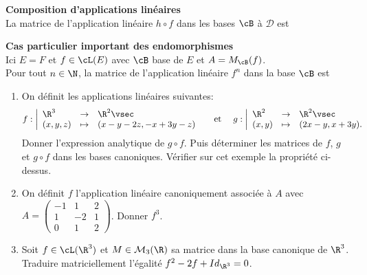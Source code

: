 \documentclass[a4paper, 11pt]{article}
\begin{document}
 


\begin{prop} \textbf{Composition d'applications lin\'eaires}\vsec\\
La matrice de l'application lin\'eaire $h\circ f$ dans les bases $\cB$ \`a $\mathcal{D}$ est \dotfill \vsec
\end{prop}




\begin{prop} \textbf{Cas particulier important des endomorphismes}\\
Ici $E=F$ et $f\in\cL(E)$ avec $\cB$ base de $E$ et $A=M_{\cB}(f)$.\vsec\\
\noindent Pour tout $n\in\N$, la matrice de l'application lin\'eaire $f^n$ dans la base $\cB$ est \dotfill \vsec
\end{prop}


{\footnotesize \begin{exercice}
\begin{enumerate}
\item On d\'efinit les applications lin\'eaires suivantes:
$$f: \left|\begin{array}{lllllllll}
\R^3 & \rightarrow & \R^2\vsec\\
(x,y,z) & \mapsto &(x-y-2z,-x+3y-z)
\end{array} \right. \quad \textmd{ et } \quad
g: \left|\begin{array}{lllllllll}
 \R^2 & \rightarrow & \R^2\vsec\\
 (x,y) & \mapsto & (2x-y, x+3y).
\end{array} \right. $$ 
Donner l'expression analytique de $g\circ f$. Puis d\'eterminer les matrices de $f$, $g$ et $g\circ f$ dans les bases canoniques. V\'erifier sur cet exemple la propri\'et\'e ci-dessus.
\item On d\'efinit $f$ l'application lin\'eaire canoniquement associ\'ee \`a $A$ avec $A=\left(\begin{array}{rrr} -1&1&2\\ 1&-2&1\\ 0&1&2  \end{array}\right)$. Donner $f^3$.
\item Soit $f\in\cL(\R^3)$ et $M\in\mathcal{M}_3(\R)$ sa matrice dans la base canonique de $\R^3$. Traduire matriciellement l'\'egalit\'e $f^2-2f+Id_{\R^3}=0$.
\end{enumerate}
\end{exercice}
}
\end{document}

